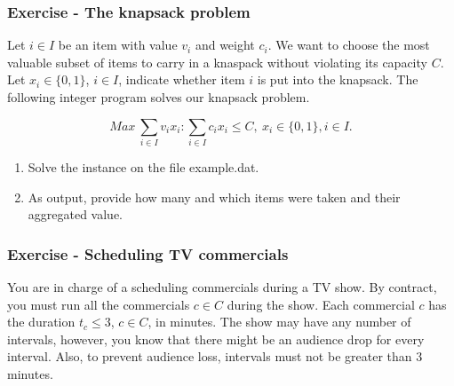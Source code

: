\documentclass{beamer}
\begin{document}
\begin{frame}
  \frametitle{Exercise - The knapsack problem}
  {\footnotesize Let $i \in I$ be an item with value $v_i$ and weight $c_i$. We want to choose the most valuable subset of items to carry in a knaspack without violating its capacity $C$. Let $x_i \in \{0, 1\}$, $i \in I$, indicate whether item $i$ is put into the knapsack. The following integer program solves our knapsack problem.}

  \vspace{-1cm}
  \begin{center}
  \begin{equation*}
  Max\ \sum_{i \in I} v_i x_i: \sum_{i \in I} c_i x_i \leq C, \ x_i \in \{0, 1\}, i \in I.
  \end{equation*}
  \end{center}

  \footnotesize
  \begin{enumerate}
  \item Solve the instance on the file example.dat.
  \item As output, provide how many and which items were taken and their aggregated value.
  \end{enumerate}
  
\end{frame}


\begin{frame}
  \frametitle{Exercise - Scheduling TV commercials}
  You are in charge of a scheduling commercials during a TV show. By contract, you must run all the commercials $c \in C$ during the show. Each commercial $c$ has the duration $t_c \leq 3$, $c \in C$, in minutes. The show may have any number of intervals, however, you know that there might be an audience drop for every interval. Also, to prevent audience loss, intervals must not be greater than 3 minutes. 
\end{frame}
\end{document}
